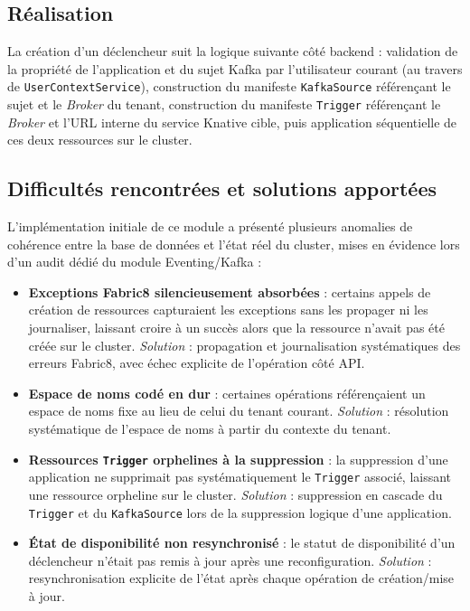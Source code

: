 \subsection{Réalisation}

La création d'un déclencheur suit la logique suivante côté backend : validation de la propriété de l'application et du sujet Kafka par l'utilisateur courant (au travers de \texttt{UserContextService}), construction du manifeste \texttt{KafkaSource} référençant le sujet et le \textit{Broker} du tenant, construction du manifeste \texttt{Trigger} référençant le \textit{Broker} et l'URL interne du service Knative cible, puis application séquentielle de ces deux ressources sur le cluster.

\subsection{Difficultés rencontrées et solutions apportées}

L'implémentation initiale de ce module a présenté plusieurs anomalies de cohérence entre la base de données et l'état réel du cluster, mises en évidence lors d'un audit dédié du module Eventing/Kafka :

\begin{itemize}
    \item \textbf{Exceptions Fabric8 silencieusement absorbées} : certains appels de création de ressources capturaient les exceptions sans les propager ni les journaliser, laissant croire à un succès alors que la ressource n'avait pas été créée sur le cluster. \textit{Solution} : propagation et journalisation systématiques des erreurs Fabric8, avec échec explicite de l'opération côté API.
    \item \textbf{Espace de noms codé en dur} : certaines opérations référençaient un espace de noms fixe au lieu de celui du tenant courant. \textit{Solution} : résolution systématique de l'espace de noms à partir du contexte du tenant.
    \item \textbf{Ressources \texttt{Trigger} orphelines à la suppression} : la suppression d'une application ne supprimait pas systématiquement le \texttt{Trigger} associé, laissant une ressource orpheline sur le cluster. \textit{Solution} : suppression en cascade du \texttt{Trigger} et du \texttt{KafkaSource} lors de la suppression logique d'une application.
    \item \textbf{État de disponibilité non resynchronisé} : le statut de disponibilité d'un déclencheur n'était pas remis à jour après une reconfiguration. \textit{Solution} : resynchronisation explicite de l'état après chaque opération de création/mise à jour.
\end{itemize}

